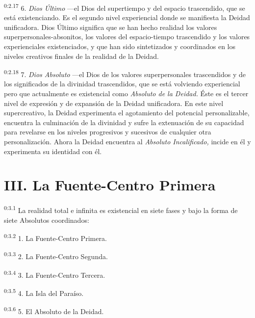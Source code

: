\par
\textsuperscript{0:2.17} 6. \textit{Dios Último} ---el Dios del supertiempo y del espacio trascendido, que se está existenciando. Es el segundo nivel experiencial donde se manifiesta la Deidad unificadora. Dios Último significa que se han hecho realidad los valores superpersonales-absonitos, los valores del espacio-tiempo trascendido y los valores experienciales existenciados, y que han sido sintetizados y coordinados en los niveles creativos finales de la realidad de la Deidad.

\par
\textsuperscript{0:2.18} 7. \textit{Dios Absoluto} ---el Dios de los valores superpersonales trascendidos y de los significados de la divinidad trascendidos, que se está volviendo experiencial pero que actualmente es existencial como \textit{Absoluto de la Deidad.} Éste es el tercer nivel de expresión y de expansión de la Deidad unificadora. En este nivel supercreativo, la Deidad experimenta el agotamiento del potencial personalizable, encuentra la culminación de la divinidad y sufre la extenuación de su capacidad para revelarse en los niveles progresivos y sucesivos de cualquier otra personalización. Ahora la Deidad encuentra al \textit{Absoluto Incalificado,} incide en él y experimenta su identidad con él.

\section*{III. La Fuente-Centro Primera}
\par
\textsuperscript{0:3.1} La realidad total e infinita es existencial en siete fases y bajo la forma de siete Absolutos coordinados:

\par
\textsuperscript{0:3.2} 1. La Fuente-Centro Primera.

\par
\textsuperscript{0:3.3} 2. La Fuente-Centro Segunda.

\par
\textsuperscript{0:3.4} 3. La Fuente-Centro Tercera.

\par
\textsuperscript{0:3.5} 4. La Isla del Paraíso.

\par
\textsuperscript{0:3.6} 5. El Absoluto de la Deidad.

